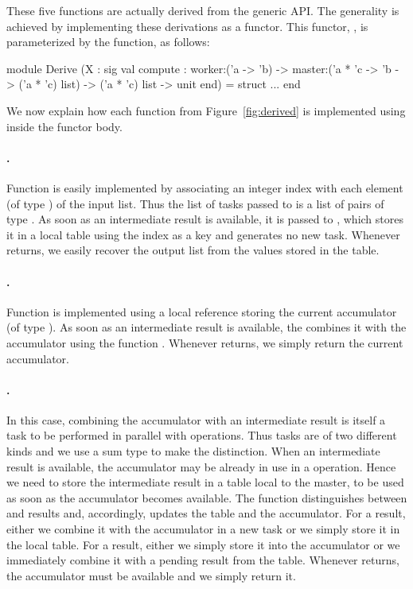 \documentclass[tfpsymp,pagenumbers]{tfp07symp}
\begin{document}
These five functions are actually derived from the generic API.  The
generality is achieved by implementing these derivations as a functor.
This functor, , is parameterized by the 
function, as follows:
\begin{ocaml}
module Derive
  (X : sig
     val compute : 
       worker:('a -> 'b) -> master:('a * 'c -> 'b -> ('a * 'c) list) ->
       ('a * 'c) list -> unit
   end) = struct ... end
\end{ocaml}
We now explain how each function from Figure~\ref{fig:derived} is
implemented using  inside the functor body.

\paragraph{.} 
Function  is easily implemented by associating an integer
index with each element (of type ) of the input list. Thus the
list of tasks passed to  is a list of pairs of type .
As soon as an intermediate result is available, it is passed to
, which stores it in a local table using the index as a key
and generates no new task. Whenever  returns, we easily
recover the output list from the values stored in the table.

\paragraph{.} 
Function  is implemented using a local reference
storing the current accumulator (of type ).  As soon as an
intermediate result is available, the  combines it with the
accumulator using the function . Whenever 
returns, we simply return the current accumulator.

\paragraph{.}
In this case, combining the accumulator with an intermediate result is
itself a task to be performed in parallel with  operations.
Thus tasks are of two different kinds and we use a sum type to make
the distinction.
When an intermediate  result is available, the
accumulator may be already in use in a  operation. Hence we
need to store the intermediate  result in a table local to the
master, to be
used as soon as the accumulator becomes available.
The  function distinguishes between  and 
results and, accordingly, updates the table and the accumulator. For a
 result, either we combine it with the accumulator in a new
task or we simply store it in the local table. For a  result,
either we simply store it into the accumulator or we immediately
combine it with a pending  result from the table.
Whenever  returns, the accumulator must be available and
we simply return it.
\end{document}
